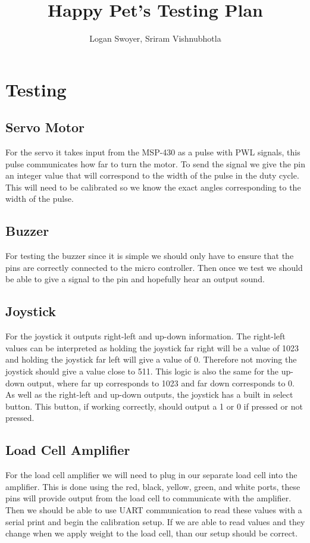 \documentclass{article}
\title{Happy Pet's Testing Plan}
\author{Logan Swoyer, Sriram Vishnubhotla}
\begin{document}
\maketitle

\section{Testing}
\subsection{Servo Motor}
For the servo it takes input from the MSP-430 as a pulse with PWL signals, this pulse communicates how far to turn the motor. To send the signal we give the pin an integer value that will correspond to the width of the pulse in the duty cycle. This will need to be calibrated so we know the exact angles corresponding to the width of the pulse.
\subsection{Buzzer}
For testing the buzzer since it is simple we should only have to ensure that the pins are correctly connected to the micro controller. Then once we test we should be able to give a signal to the pin and hopefully hear an output sound.
\subsection{Joystick}
For the joystick it outputs right-left and up-down information. The right-left values can be interpreted as holding the joystick far right will be a value of 1023 and holding the joystick far left will give a value of 0. Therefore not moving the joystick should give a value close to 511. This logic is also the same for the up-down output, where far up corresponds to 1023 and far down corresponds to 0. \\
As well as the right-left and up-down outputs, the joystick has a built in select button. This button, if working correctly, should output a 1 or 0 if pressed or not pressed.
\subsection{Load Cell Amplifier}
For the load cell amplifier we will need to plug in our separate load cell into the amplifier. This is done using the red, black, yellow, green, and white ports, these pins will provide output from the load cell to communicate with the amplifier. Then we should be able to use UART communication to read these values with a serial print and begin the calibration setup. If we are able to read values and they change when we apply weight to the load cell, than our setup should be correct.
\end{document}
